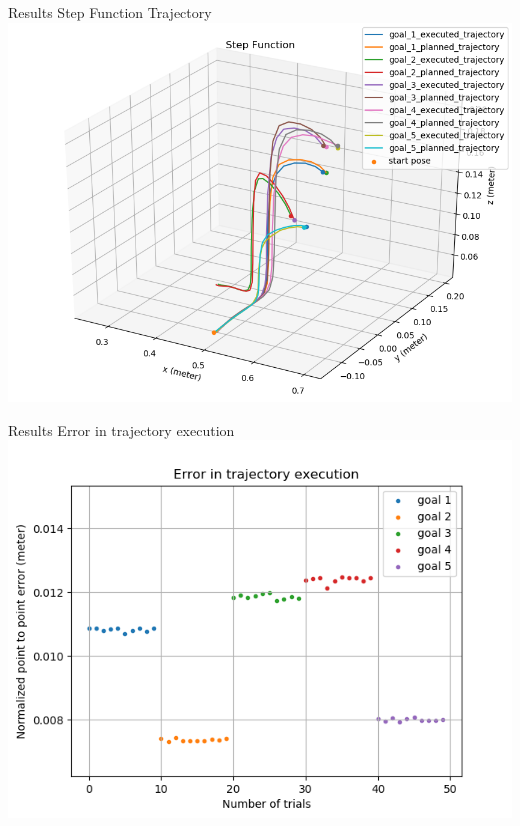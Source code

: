 \documentclass{beamer}
\begin{document}
	\begin{frame}{Results}
		Step Function Trajectory
		\centering
		\includegraphics[scale=0.4]{images/1/step.png}
	\end{frame}
	\begin{frame}{Results}
		\centering
		Error in trajectory execution
		\includegraphics[scale=0.4]{images/1/step_e.png}
	\end{frame}
		
\end{document}
